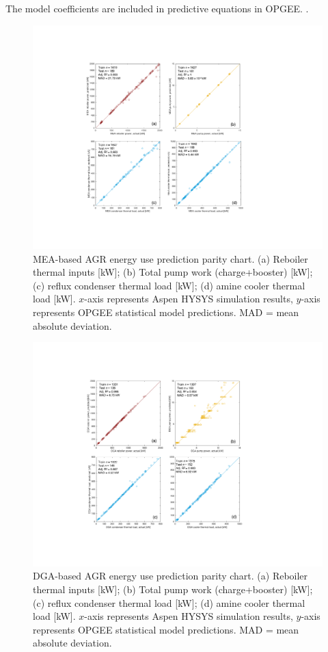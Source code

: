 \documentclass[11pt]{report}
\newcommand{\marg}[1]{{\footnotesize\textit{\textcolor{stanford}{'#1'}}}}
\newcommand{\marginnote}[1]{\marginpar{\marg{#1}}}
\begin{document}
The model coefficients are included in predictive equations in OPGEE. \marginnote{Acid Gas Removal 1.2.9}. 

\begin{figure}
\includegraphics[width=1\columnwidth]{images/MEA_comb.pdf}
\caption{MEA-based AGR energy use prediction parity chart. (a) Reboiler thermal inputs [kW]; (b) Total pump work (charge+booster) [kW]; (c) reflux condenser thermal load [kW]; (d) amine cooler thermal load [kW]. $x$-axis represents Aspen HYSYS simulation results, $y$-axis represents OPGEE statistical model predictions. MAD = mean absolute deviation.}
\label{fig:AGR_resid_MEA}
\end{figure}

\begin{figure}
\includegraphics[width=1\columnwidth]{images/DGA_comb.pdf}
\caption{DGA-based AGR energy use prediction parity chart. (a) Reboiler thermal inputs [kW]; (b) Total pump work (charge+booster) [kW]; (c) reflux condenser thermal load [kW]; (d) amine cooler thermal load [kW]. $x$-axis represents Aspen HYSYS simulation results, $y$-axis represents OPGEE statistical model predictions. MAD = mean absolute deviation.}
\label{fig:AGR_resid_DGA}
\end{figure}
\end{document}
